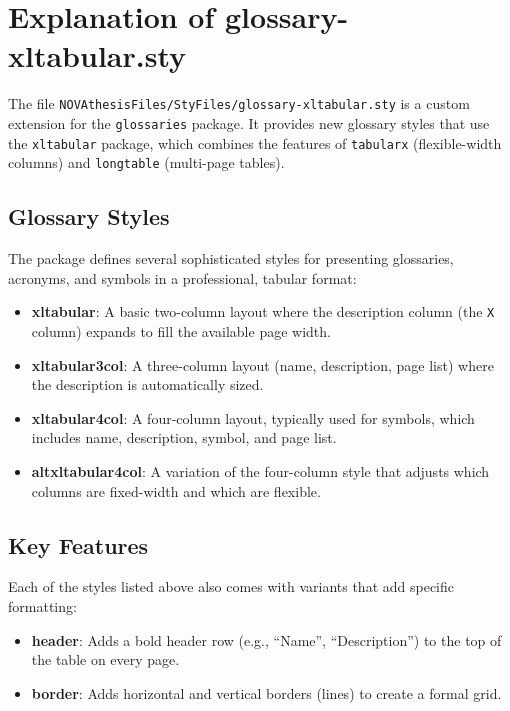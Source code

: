 

\chapter{Explanation of glossary-xltabular.sty}
\label{annex:glossary-xltabular}

The file \texttt{NOVAthesisFiles/StyFiles/glossary-xltabular.sty} is a custom extension for the \texttt{glossaries} package. It provides new glossary styles that use the \texttt{xltabular} package, which combines the features of \texttt{tabularx} (flexible-width columns) and \texttt{longtable} (multi-page tables).

\section{Glossary Styles}
The package defines several sophisticated styles for presenting glossaries, acronyms, and symbols in a professional, tabular format:

\begin{itemize}
    \item \textbf{xltabular}: A basic two-column layout where the description column (the \texttt{X} column) expands to fill the available page width.
    \item \textbf{xltabular3col}: A three-column layout (name, description, page list) where the description is automatically sized.
    \item \textbf{xltabular4col}: A four-column layout, typically used for symbols, which includes name, description, symbol, and page list.
    \item \textbf{altxltabular4col}: A variation of the four-column style that adjusts which columns are fixed-width and which are flexible.
\end{itemize}

\section{Key Features}
Each of the styles listed above also comes with variants that add specific formatting:
\begin{itemize}
    \item \textbf{header}: Adds a bold header row (e.g., ``Name'', ``Description'') to the top of the table on every page.
    \item \textbf{border}: Adds horizontal and vertical borders (lines) to create a formal grid.
\end{itemize}

